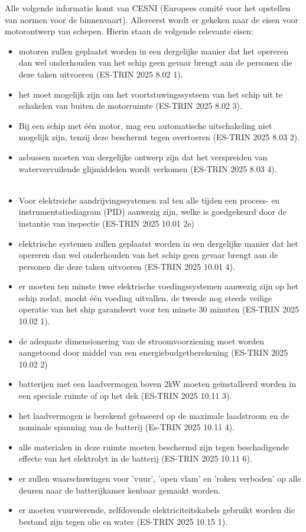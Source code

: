 Alle volgende informatie komt van CESNI (Europees comité voor het opstellen van normen voor de binnenvaart)\cite{cesni2025inlandstandards}.
Allereerst wordt er gekeken naar de eisen voor motorontwerp van schepen.
Hierin staan de volgende relevante eisen:
\begin{itemize}
    \item motoren zullen geplaatst worden in een dergelijke manier dat het opereren dan wel onderhouden van het schip geen gevaar brengt aan de personen die deze taken uitvoeren (ES-TRIN 2025 8.02 1).
    \item het moet mogelijk zijn om het voortstuwingssysteem van het schip uit te schakelen van buiten de motorruimte (ES-TRIN 2025 8.02 3).
    \item Bij een schip met één motor, mag een automatische uitschakeling niet mogelijk zijn, tenzij deze beschermt tegen overtoeren (ES-TRIN 2025 8.03 2).
    \item asbussen moeten van dergelijke ontwerp zijn dat het verspreiden van watervervuilende glijmiddelen wordt verkomen (ES-TRIN 2025 8.03 4).\\\\
    \item Voor elektrsiche aandrijvingssystemen zal ten alle tijden een process- en instrumentatiediagram (PID) aanwezig zijn, welke is goedgekeurd door de instantie van inspectie (ES-TRIN 2025 10.01 2e)
    \item elektrische systemen zullen geplaatst worden in een dergelijke manier dat het opereren dan wel onderhouden van het schip geen gevaar brengt aan de personen die deze taken uitvoeren (ES-TRIN 2025 10.01 4).
    \item er moeten ten minste twee elektrische voedingssystemen aanwezig zijn op het schip zodat, mocht één voeding uitvallen, de tweede nog steeds veilige operatie van het ship garandeert voor ten minste 30 minuten (ES-TRIN 2025 10.02 1).
    \item de adequate dimensionering van de stroomvoorziening  moet worden aangetoond door middel van een energiebudgetberekening (ES-TRIN 2025 10.02 2)
    \item batterijen met een laadvermogen boven 2kW moeten geïnstalleerd worden in een speciale ruimte of op het dek (ES-TRIN 2025 10.11 3).
    \item het laadvermogen is berekend gebaseerd op de maximale laadstroom en de nominale spanning van de batterij (Es-TRIN 2025 10.11 4).
    \item alle materialen in deze ruimte moeten beschermd zijn tegen beschadigende effecte van het elektrolyt in de batterij (ES-TRIN 2025 10.11 6).
    \item er zullen waarschuwingen voor 'vuur', 'open vlam' en 'roken verboden' op alle deuren naar de batterijkamer kenbaar gemaakt worden.
    \item er moeten vuurwerende, zelfdovende elektriciteitskabels gebruikt worden die bestand zijn tegen olie en water (ES-TRIN 2025 10.15 1).
\end{itemize}

